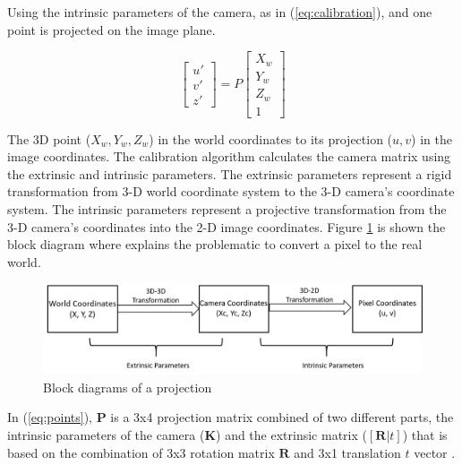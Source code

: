Using the intrinsic parameters of the camera, as in (\ref{eq:calibration}), and one point is projected on the image plane. 


\begin{equation}
    \label{eq:calibration}
    \begin{bmatrix}
        u'
        \\v' 
        \\ z' 
        
        \end{bmatrix} = P \begin{bmatrix}
        X_w\\
        Y_w 
        \\ Z_w
        \\ 1
        
        \end{bmatrix}
\end{equation}

The 3D point ($X_w, Y_w, Z_w$) in the world coordinates to its projection ($u, v$) in the image coordinates. The calibration algorithm calculates the camera matrix using the extrinsic and intrinsic parameters. The extrinsic parameters represent a rigid transformation from 3-D world coordinate system to the 3-D camera’s coordinate system. The intrinsic parameters represent a projective transformation from the 3-D camera’s coordinates into the 2-D image coordinates. Figure \ref{fig:block_extrinsinc} is shown the block diagram where explains the problematic to convert a pixel to the real world. 


\begin{figure}[H]
\centering
\includegraphics[scale=0.8]{imagens/block_parameters.png}
\caption{Block diagrams of a projection}
\label{fig:block_extrinsinc}
\end{figure}





In (\ref{eq:points}), $\mathbf{P}$ is a 3x4 projection matrix combined of two different parts, the intrinsic parameters of the camera ($\mathbf{K}$) and the extrinsic matrix ($[\mathbf{R}|t]$) that is based on the combination of 3x3 rotation matrix $\mathbf{R}$ and 3x1 translation $t$ vector \cite{kaehler2016learning}. 

